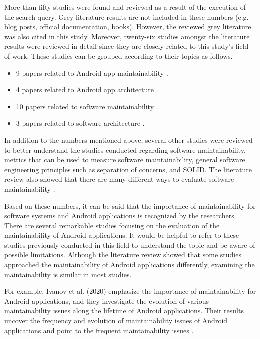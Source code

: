 More than fifty studies were found and reviewed as a result of the execution of the search query. Grey literature results are not included in these numbers (e.g. blog posts, official documentation, books). However, the reviewed grey literature was also cited in this study. Moreover, twenty-six studies amongst the literature results were reviewed in detail since they are closely related to this study's field of work. These studies can be grouped according to their topics as follows.
\begin{itemize}
    \item 9 papers related to Android app maintainability \cite{34,50,52,2,53,43,44,18,19}.
    \item 4 papers related to Android app architecture \cite{56,14,48,47}.
    \item 10 papers related to software maintainability \cite{23,26,33,36,45,4,22,46,35,49}.
    \item 3 papers related to software architecture \cite{27,28,25}.
\end{itemize}

In addition to the numbers mentioned above, several other studies were reviewed to better understand the studies conducted regarding software maintainability, metrics that can be used to measure software maintainability, general software engineering principles such as separation of concerns, and SOLID. The literature review also showed that there are many different ways to evaluate software maintainability \cite{33,36,45,35,49}.  

Based on these numbers, it can be said that the importance of maintainability for software systems and Android applications is recognized by the researchers. There are several remarkable studies focusing on the evaluation of the maintainability of Android applications. It would be helpful to refer to these studies previously conducted in this field to understand the topic and be aware of possible limitations. Although the literature review showed that some studies approached the maintainability of Android applications differently, examining the maintainability is similar in most studies. 

For example, Ivanov et al. (2020) emphasize the importance of maintainability for Android applications, and they investigate the evolution of various maintainability issues along the lifetime of Android applications. Their results uncover the frequency and evolution of maintainability issues of Android applications and point to the frequent maintainability issues \cite{53}.

